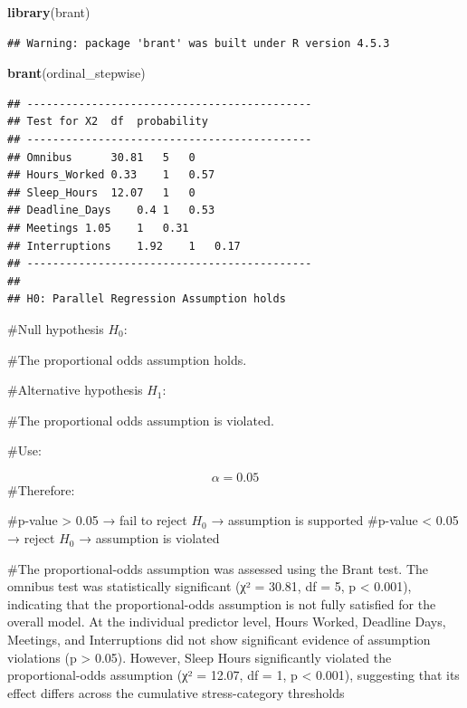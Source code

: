 \documentclass[
]{article}
\newenvironment{Shaded}{\begin{snugshade}}{\end{snugshade}}
\newcommand{\FunctionTok}[1]{\textcolor[rgb]{0.13,0.29,0.53}{\textbf{#1}}}
\newcommand{\NormalTok}[1]{#1}
\begin{document}
\begin{Shaded}
\begin{Highlighting}[]
\FunctionTok{library}\NormalTok{(brant)}
\end{Highlighting}
\end{Shaded}

\begin{verbatim}
## Warning: package 'brant' was built under R version 4.5.3
\end{verbatim}

\begin{Shaded}
\begin{Highlighting}[]
\FunctionTok{brant}\NormalTok{(ordinal\_stepwise)}
\end{Highlighting}
\end{Shaded}

\begin{verbatim}
## -------------------------------------------- 
## Test for X2  df  probability 
## -------------------------------------------- 
## Omnibus      30.81   5   0
## Hours_Worked 0.33    1   0.57
## Sleep_Hours  12.07   1   0
## Deadline_Days    0.4 1   0.53
## Meetings 1.05    1   0.31
## Interruptions    1.92    1   0.17
## -------------------------------------------- 
## 
## H0: Parallel Regression Assumption holds
\end{verbatim}

\#Null hypothesis \(H_0\):

\#The proportional odds assumption holds.

\#Alternative hypothesis \(H_1\):

\#The proportional odds assumption is violated.

\#Use:

\[ \alpha = 0.05 \] \#Therefore:

\#p-value \textgreater{} 0.05 → fail to reject \(H_0\) → assumption is
supported \#p-value \textless{} 0.05 → reject \(H_0\) → assumption is
violated

\#The proportional-odds assumption was assessed using the Brant test.
The omnibus test was statistically significant (χ² = 30.81, df = 5, p
\textless{} 0.001), indicating that the proportional-odds assumption is
not fully satisfied for the overall model. At the individual predictor
level, Hours Worked, Deadline Days, Meetings, and Interruptions did not
show significant evidence of assumption violations (p \textgreater{}
0.05). However, Sleep Hours significantly violated the proportional-odds
assumption (χ² = 12.07, df = 1, p \textless{} 0.001), suggesting that
its effect differs across the cumulative stress-category thresholds
\end{document}
